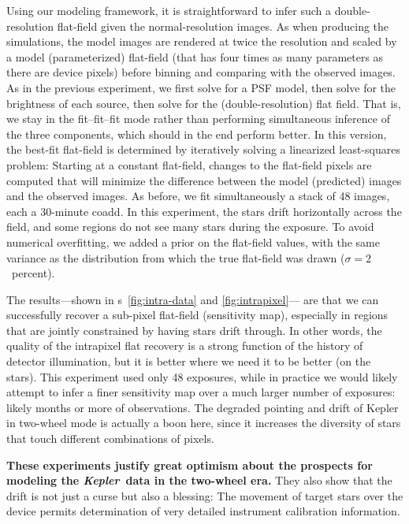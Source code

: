 \documentclass[letterpaper,12pt,whitepaper]{haastex}
\newcommand{\observatory}[1]{\textsl{#1}}
\newcommand{\Kepler}{\observatory{Kepler}}
\begin{document}
Using our modeling framework,
  it is straightforward to infer such a double-resolution flat-field
  given the normal-resolution images.
As when producing the simulations,
  the model images are rendered at twice the resolution and scaled by a model (parameterized) flat-field
  (that has four times as many parameters as there are device pixels)
  before binning and comparing with the observed images.
As in the previous experiment,
  we first solve for a PSF model,
  then solve for the brightness of each source,
  then solve for the (double-resolution) flat field.
That is, we stay in the fit--fit--fit mode rather than performing simultaneous inference
  of the three components, which should in the end perform better.
In this version, the best-fit flat-field is determined by iteratively solving a linearized least-squares problem:
Starting at a constant flat-field,
  changes to the flat-field pixels are computed that will minimize the difference
  between the model (predicted) images and the observed images.
As before, we fit simultaneously a stack of 48 images, each a 30-minute coadd.
In this experiment, the stars drift horizontally across the field,
  and some regions do not see many stars during the exposure.
To avoid numerical overfitting, we added a prior on the flat-field values,
  with the same variance as the distribution from which the true flat-field was drawn ($\sigma = 2$~percent).

The results---shown in \figurename s~\ref{fig:intra-data} and \ref{fig:intrapixel}---%
  are that we can successfully recover a sub-pixel flat-field (sensitivity map),
  especially in regions that are jointly constrained by having stars drift through.
In other words, the quality of the intrapixel flat recovery is a strong function of the history
  of detector illumination, but it is better where we need it to be better (on the stars).
This experiment used only 48 exposures,
  while in practice we would likely attempt to infer a finer sensitivity map
  over a much larger number of exposures: likely months or more of observations.
The degraded pointing and drift of Kepler in two-wheel mode is actually a boon here,
  since it increases the diversity of stars that touch different combinations of pixels.

\textbf{These experiments justify great optimism about the prospects for modeling the \Kepler\ data in the two-wheel era.}
They also show that the drift is not just a curse but also a blessing:
The movement of target stars over the device
  permits determination of very detailed instrument calibration information.
\end{document}
